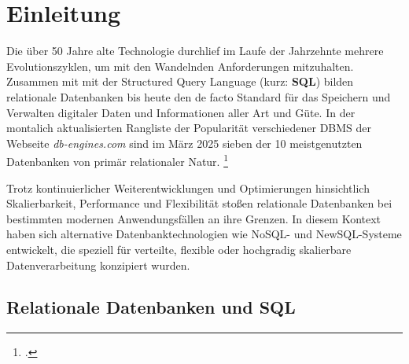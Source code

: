 \section{Einleitung}

Die über 50 Jahre alte Technologie durchlief im Laufe der Jahrzehnte mehrere Evolutionszyklen, um mit den Wandelnden Anforderungen mitzuhalten. Zusammen mit mit der Structured Query Language (kurz: \textbf{SQL}) bilden relationale Datenbanken bis heute den de facto  Standard für das Speichern und Verwalten digitaler Daten und Informationen aller Art und Güte. In der montalich aktualisierten Rangliste der Popularität verschiedener DBMS der Webseite \textit{db-engines.com} sind im März 2025 sieben der 10 meistgenutzten Datenbanken von primär relationaler Natur. \footcite{redgatesoftwareltd.DBEnginesRanking2025}

Trotz kontinuierlicher Weiterentwicklungen und Optimierungen hinsichtlich Skalierbarkeit, Performance und Flexibilität stoßen relationale Datenbanken bei bestimmten modernen Anwendungsfällen an ihre Grenzen. In diesem Kontext haben sich alternative Datenbanktechnologien wie NoSQL- und NewSQL-Systeme entwickelt, die speziell für verteilte, flexible oder hochgradig skalierbare Datenverarbeitung konzipiert wurden.


\subsection{Relationale Datenbanken und SQL}

